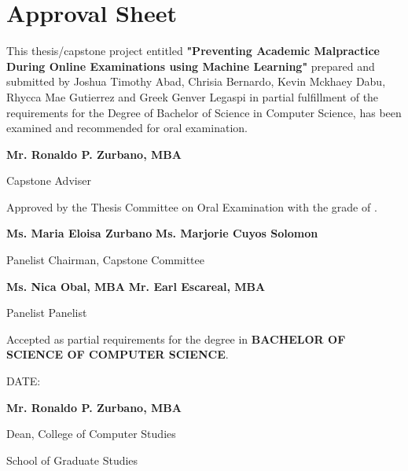 \section*{\hfill Approval Sheet \hfill}

This thesis/capstone project entitled \textbf{"Preventing Academic Malpractice During Online Examinations using Machine Learning" }prepared and submitted by Joshua Timothy Abad, Chrisia Bernardo, Kevin Mckhaey Dabu, Rhycca Mae Gutierrez and Greek Genver Legaspi in partial fulfillment of the requirements for the Degree of Bachelor of Science in Computer Science, has been examined and recommended for oral examination.

\vspace{2em}

\begin{flushright}
    \textbf{Mr. Ronaldo P. Zurbano, MBA}

    Capstone Adviser
\end{flushright}

\vspace{2em}

\noindent
Approved by the Thesis Committee on Oral Examination with the grade of \makebox[1.0in]{\hrulefill}.

\vspace{2em}

\noindent \textbf{Ms. Maria Eloisa Zurbano} \hfill \textbf{Ms. Marjorie Cuyos Solomon }

\noindent Panelist \hfill Chairman, Capstone Committee

\vspace{2em}

\noindent \textbf{Ms. Nica Obal, MBA} \hfill \textbf{Mr. Earl Escareal, MBA}

\noindent Panelist \hfill Panelist

\vspace{2em}

\noindent
Accepted as partial requirements for the degree in \textbf{BACHELOR OF SCIENCE OF COMPUTER SCIENCE}.

\noindent
DATE: \makebox[1.0in]{\hrulefill}

\vspace{2em}

\begin{flushright}
    \textbf{Mr. Ronaldo P. Zurbano, MBA}

    Dean, College of Computer Studies

    School of Graduate Studies
\end{flushright}
